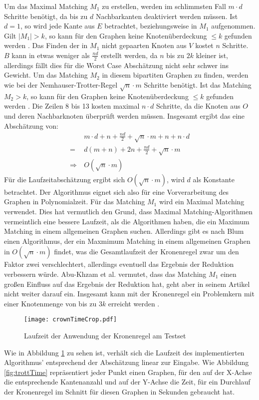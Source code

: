 Um das Maximal Matching $M_{1}$ zu erstellen, werden im schlimmsten Fall $m \cdot d$ Schritte benötigt, da bis zu $d$ Nachbarkanten deaktiviert werden müssen. Ist $d = 1$, so wird jede Kante aus $E$ betrachtet, beziehungsweise in $M_{1}$ aufgenommen. Gilt $|M_{1}| > k$, so kann für den Graphen keine Knotenüberdeckung  $ \leq k$ gefunden werden \cite{paper:7}. Das Finden der in $M_{1}$ nicht gepaarten Knoten aus $V$ kostet $n$ Schritte. $B$ kann in etwas weniger als $\frac{nd}{2}$ erstellt werden, da $n$ bis zu $2k$ kleiner ist, allerdings fällt dies für die Worst Case Abschätzung nicht sehr schwer ins Gewicht. Um das Matching $M_{2}$ in diesem bipartiten Graphen zu finden, werden wie bei der Nemhauser-Trotter-Regel  $\sqrt{n} \cdot m$ Schritte benötigt. Ist das Matching $M_{2} > k$, so kann für den Graphen keine Knotenüberdeckung  $ \leq k$ gefunden werden \cite{paper:7}. Die Zeilen 8 bis 13 kosten maximal $n \cdot d$ Schritte, da die Knoten aus $O$ und deren Nachbarknoten überprüft werden müssen. Insgesamt ergibt das eine Abschätzung von:
\begin{align}
&\ m \cdot d + n + \frac{nd}{2} + \sqrt{n} \cdot m + n  + n \cdot d \\
=&\ d (m+n) +2 n + \frac{nd}{2} + \sqrt{n} \cdot m \\
\Rightarrow &\ O(\sqrt{n} \cdot m)
\end{align}
Für die Laufzeitabschätzung ergibt sich $O(\sqrt{n} \cdot m)$, wird $d$ als Konstante betrachtet. Der Algorithmus eignet sich also für eine Vorverarbeitung des Graphen in Polynomialzeit. Für das Matching $M_{1}$ wird ein Maximal Matching verwendet. Dies hat vermutlich den Grund, dass Maximal Matching-Algorithmen vermeintlich eine bessere Laufzeit, als die Algorithmen haben, die ein Maximum Matching in einem allgemeinen Graphen suchen. Allerdings gibt es nach Blum \cite{paper:8} einen Algorithmus, der ein Maxmimum Matching in einem allgemeinen Graphen in $O(\sqrt{n} \cdot m)$ findet, was die Gesamtlaufzeit der Kronenregel zwar um den Faktor zwei verschlechtert, allerdings eventuell das Ergebnis der Reduktion verbessern würde. Abu-Khzam et al. \cite{paper:7} vermutet, dass das Matching $M_{1}$ einen großen Einfluss auf das Ergebnis der Reduktion hat, geht aber in seinem Artikel nicht weiter darauf ein. Insgesamt kann mit der Kronenregel ein Problemkern mit einer Knotenmenge von bis zu $3k$ erreicht werden \cite{fixed}.
\begin{figure}[htb]
\centering
  	{\texttt{[image: crownTimeCrop.pdf]}}
	\caption{Laufzeit der Anwendung der Kronenregel am Testset\label{fig:crownTime}}
\centering
\end{figure}
Wie in Abbildung \ref{fig:crownTime} zu sehen ist, verhält sich die Laufzeit des implementierten Algorithmus' entsprechend der Abschätzung linear zur Eingabe. Wie Abbildung \ref{fig:trottTime} repräsentiert jeder Punkt einen Graphen, für den auf der X-Achse die entsprechende Kantenanzahl und auf der Y-Achse die Zeit, für ein Durchlauf der Kronenregel im Schnitt für diesen Graphen in Sekunden gebraucht hat.
